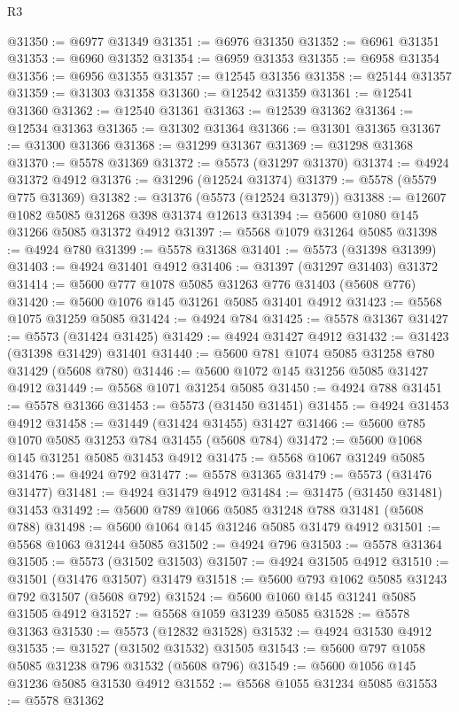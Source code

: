\begin{lexlean}{R3}
\begin{coremodule}
@31350 := @6977 @31349
@31351 := @6976 @31350
@31352 := @6961 @31351
@31353 := @6960 @31352
@31354 := @6959 @31353
@31355 := @6958 @31354
@31356 := @6956 @31355
@31357 := @12545 @31356
@31358 := @25144 @31357
@31359 := @31303 @31358
@31360 := @12542 @31359
@31361 := @12541 @31360
@31362 := @12540 @31361
@31363 := @12539 @31362
@31364 := @12534 @31363
@31365 := @31302 @31364
@31366 := @31301 @31365
@31367 := @31300 @31366
@31368 := @31299 @31367
@31369 := @31298 @31368
@31370 := @5578 @31369
@31372 := @5573 (@31297 @31370)
@31374 := @4924 @31372 @4912
@31376 := @31296 (@12524 @31374)
@31379 := @5578 (@5579 @775 @31369)
@31382 := @31376 (@5573 (@12524 @31379))
@31388 := @12607 @1082 @5085 @31268 @398 @31374 @12613
@31394 := @5600 @1080 @145 @31266 @5085 @31372 @4912
@31397 := @5568 @1079 @31264 @5085
@31398 := @4924 @780
@31399 := @5578 @31368
@31401 := @5573 (@31398 @31399)
@31403 := @4924 @31401 @4912
@31406 := @31397 (@31297 @31403) @31372
@31414 := @5600 @777 @1078 @5085 @31263 @776 @31403 (@5608 @776)
@31420 := @5600 @1076 @145 @31261 @5085 @31401 @4912
@31423 := @5568 @1075 @31259 @5085
@31424 := @4924 @784
@31425 := @5578 @31367
@31427 := @5573 (@31424 @31425)
@31429 := @4924 @31427 @4912
@31432 := @31423 (@31398 @31429) @31401
@31440 := @5600 @781 @1074 @5085 @31258 @780 @31429 (@5608 @780)
@31446 := @5600 @1072 @145 @31256 @5085 @31427 @4912
@31449 := @5568 @1071 @31254 @5085
@31450 := @4924 @788
@31451 := @5578 @31366
@31453 := @5573 (@31450 @31451)
@31455 := @4924 @31453 @4912
@31458 := @31449 (@31424 @31455) @31427
@31466 := @5600 @785 @1070 @5085 @31253 @784 @31455 (@5608 @784)
@31472 := @5600 @1068 @145 @31251 @5085 @31453 @4912
@31475 := @5568 @1067 @31249 @5085
@31476 := @4924 @792
@31477 := @5578 @31365
@31479 := @5573 (@31476 @31477)
@31481 := @4924 @31479 @4912
@31484 := @31475 (@31450 @31481) @31453
@31492 := @5600 @789 @1066 @5085 @31248 @788 @31481 (@5608 @788)
@31498 := @5600 @1064 @145 @31246 @5085 @31479 @4912
@31501 := @5568 @1063 @31244 @5085
@31502 := @4924 @796
@31503 := @5578 @31364
@31505 := @5573 (@31502 @31503)
@31507 := @4924 @31505 @4912
@31510 := @31501 (@31476 @31507) @31479
@31518 := @5600 @793 @1062 @5085 @31243 @792 @31507 (@5608 @792)
@31524 := @5600 @1060 @145 @31241 @5085 @31505 @4912
@31527 := @5568 @1059 @31239 @5085
@31528 := @5578 @31363
@31530 := @5573 (@12832 @31528)
@31532 := @4924 @31530 @4912
@31535 := @31527 (@31502 @31532) @31505
@31543 := @5600 @797 @1058 @5085 @31238 @796 @31532 (@5608 @796)
@31549 := @5600 @1056 @145 @31236 @5085 @31530 @4912
@31552 := @5568 @1055 @31234 @5085
@31553 := @5578 @31362

\end{coremodule}
\end{lexlean}
